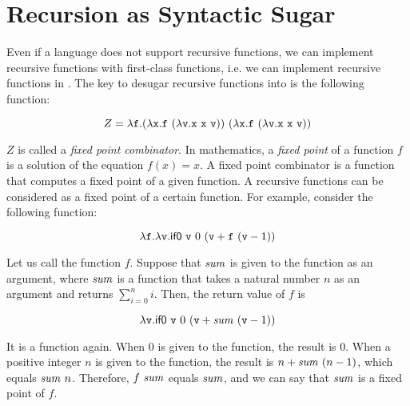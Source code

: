 \section{Recursion as Syntactic Sugar}

Even if a language does not support recursive functions, we can implement
recursive functions with first-class functions, i.e. we can implement recursive
functions in \plang. The key to desugar recursive functions into \plang is the
following function:

\[
  Z=\efun{\cf}{\eapp
    {(\efun{\cx}{\eapp{\cf}{(\efun{\cv}{\eapp{\eapp{\cx}{\cx}}{\cv}})}})}
    {(\efun{\cx}{\eapp{\cf}{(\efun{\cv}{\eapp{\eapp{\cx}{\cx}}{\cv}})}})}
  }
\]

$Z$ is called a \textit{fixed point combinator}.
In mathematics, a \textit{fixed point}
of a function $f$ is a solution of the equation $f(x)=x$.
A fixed point combinator is a function that computes a fixed point of a given
function. A recursive functions can be considered as a fixed point of a certain
function. For example, consider the following function:

\[ \lambda\texttt{f}.\lambda\texttt{v}.\textsf{if0}\ \texttt{v}\ 0\ (\texttt{v}+\texttt{f}\ (\texttt{v}-1)) \]

Let us call the function $f$.
Suppose that $\mbox{\emph{sum}}$ is given to the function as an argument, where
$\mbox{\emph{sum}}$ is a function that takes a natural number $n$ as an argument
and returns $\sum_{i=0}^n i$. Then, the return value of $f$ is

\[
  \lambda\texttt{v}.\textsf{if0}\ \texttt{v}\ 0\ (\texttt{v}+\mbox{\emph{sum}}\ (\texttt{v}-1))
\]

It is a function again. When $0$ is given to the function, the result is $0$.
When a positive integer $n$ is given to the function, the result is
$n+\mbox{\emph{sum}}\ (n-1)$, which equals $\mbox{\emph{sum}}\ n$.
Therefore, $f\ \mbox{\emph{sum}}$ equals $\mbox{\emph{sum}}$, and we can say that
$\mbox{\emph{sum}}$ is a fixed point of $f$.

